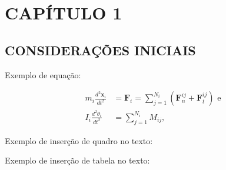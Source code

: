 
\chapter{CAPÍTULO 1}
\label{chap:chapter1}

\section{CONSIDERAÇÕES INICIAIS}

Exemplo de equação:

\begin{align}
	m_{i}\frac{d^{2}\boldsymbol{x}_{i}}{dt^{2}}&=\boldsymbol{F}_{i}=\sum_{j=1}^{N_{i}} (\boldsymbol{F}_{n}^{ij}+\boldsymbol{F}_{t}^{ij})\text{ e} \\
	I_{i}\frac{d^{2}\theta_{i}}{dt^{2}}&=\sum_{j=1}^{N_{i}} M_{ij}\text{,}
\end{align}

Exemplo de inserção de quadro no texto:


Exemplo de inserção de tabela no texto:

